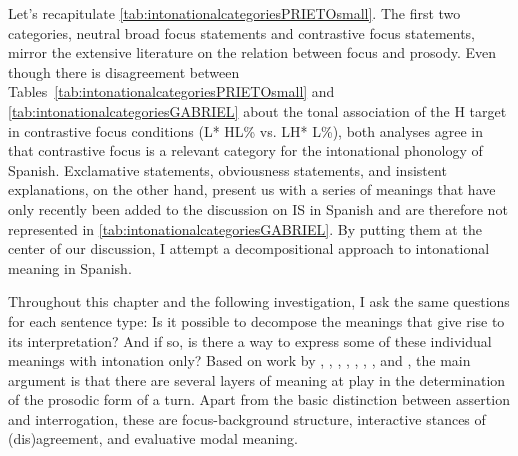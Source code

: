 Let's recapitulate \autoref{tab:intonationalcategoriesPRIETOsmall}. The first two categories, neutral broad focus 
statements and contrastive focus statements, mirror the extensive literature on the relation between focus and prosody. Even though there is 
disagreement between Tables~\ref{tab:intonationalcategoriesPRIETOsmall} and 
\ref{tab:intonationalcategoriesGABRIEL} about the tonal association of 
the H target in contrastive focus conditions (L* HL\% vs. LH* L\%), both 
analyses agree in that contrastive focus is a relevant category for the 
intonational phonology of Spanish. Exclamative statements, obviousness 
statements, and insistent explanations, on the other hand, present us with 
a series of meanings that have only recently been added to the discussion on \ac{IS} in Spanish and are therefore not represented in \autoref{tab:intonationalcategoriesGABRIEL}. By putting them at the center 
of our discussion, I attempt a decompositional approach to intonational meaning in Spanish. 

Throughout this chapter and the following investigation, I ask the same 
questions for each sentence type: Is it possible to decompose the meanings that give 
rise to its interpretation? And if so, is there a way to express some of 
these individual meanings with intonation only? Based on work by \citet{Kratzer.1991,Kratzer.2012}, \citet{ZanuttiniPortner2003}, \citet{Potts.2007expressivedimension}, \citet{FarkasBruce.2010}, \citet{BianchiBocciCruschina.2016}, \citet{Roberts.2017}, \citet{Reich.2018}, and \citet{Rett.2021emotivemarkers}, the main argument is that there are several layers of meaning at play in the determination of the prosodic form of a turn. Apart from the basic distinction between assertion and interrogation, these are focus-background structure, interactive stances of (dis)agreement, and evaluative modal meaning. %
	
